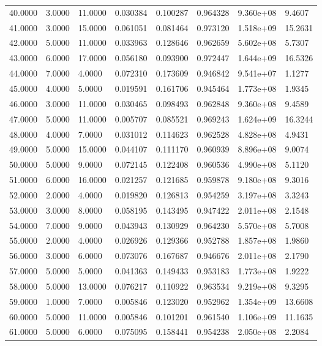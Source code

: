 \documentclass[11pt]{report}
\begin{document}
\begin{longtable}{llllllll}
40.0000 & 3.0000 & 11.0000 & 0.030384 & 0.100287 & 0.964328 & 9.360e+08 & 9.4607 \\
41.0000 & 3.0000 & 15.0000 & 0.061051 & 0.081464 & 0.973120 & 1.518e+09 & 15.2631 \\
42.0000 & 5.0000 & 11.0000 & 0.033963 & 0.128646 & 0.962659 & 5.602e+08 & 5.7307 \\
43.0000 & 6.0000 & 17.0000 & 0.056180 & 0.093900 & 0.972447 & 1.644e+09 & 16.5326 \\
44.0000 & 7.0000 & 4.0000 & 0.072310 & 0.173609 & 0.946842 & 9.541e+07 & 1.1277 \\
45.0000 & 4.0000 & 5.0000 & 0.019591 & 0.161706 & 0.945464 & 1.773e+08 & 1.9345 \\
46.0000 & 3.0000 & 11.0000 & 0.030465 & 0.098493 & 0.962848 & 9.360e+08 & 9.4589 \\
47.0000 & 5.0000 & 11.0000 & 0.005707 & 0.085521 & 0.969243 & 1.624e+09 & 16.3244 \\
48.0000 & 4.0000 & 7.0000 & 0.031012 & 0.114623 & 0.962528 & 4.828e+08 & 4.9431 \\
49.0000 & 5.0000 & 15.0000 & 0.044107 & 0.111170 & 0.960939 & 8.896e+08 & 9.0074 \\
50.0000 & 5.0000 & 9.0000 & 0.072145 & 0.122408 & 0.960536 & 4.990e+08 & 5.1120 \\
51.0000 & 6.0000 & 16.0000 & 0.021257 & 0.121685 & 0.959878 & 9.180e+08 & 9.3016 \\
52.0000 & 2.0000 & 4.0000 & 0.019820 & 0.126813 & 0.954259 & 3.197e+08 & 3.3243 \\
53.0000 & 3.0000 & 8.0000 & 0.058195 & 0.143495 & 0.947422 & 2.011e+08 & 2.1548 \\
54.0000 & 7.0000 & 9.0000 & 0.043943 & 0.130929 & 0.964230 & 5.570e+08 & 5.7008 \\
55.0000 & 2.0000 & 4.0000 & 0.026926 & 0.129366 & 0.952788 & 1.857e+08 & 1.9860 \\
56.0000 & 3.0000 & 6.0000 & 0.073076 & 0.167687 & 0.946676 & 2.011e+08 & 2.1790 \\
57.0000 & 5.0000 & 5.0000 & 0.041363 & 0.149433 & 0.953183 & 1.773e+08 & 1.9222 \\
58.0000 & 5.0000 & 13.0000 & 0.076217 & 0.110922 & 0.963534 & 9.219e+08 & 9.3295 \\
59.0000 & 1.0000 & 7.0000 & 0.005846 & 0.123020 & 0.952962 & 1.354e+09 & 13.6608 \\
60.0000 & 5.0000 & 11.0000 & 0.005846 & 0.101201 & 0.961540 & 1.106e+09 & 11.1635 \\
61.0000 & 5.0000 & 6.0000 & 0.075095 & 0.158441 & 0.954238 & 2.050e+08 & 2.2084 \\

\end{longtable}
\end{document}
